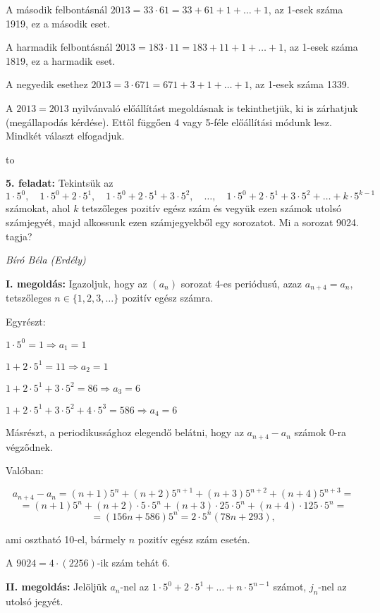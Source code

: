 \documentclass[a4paper,10pt]{article}
\newcommand{\ki}[2]{\hfill {\it #1 (#2)}\medskip}
\newcommand{\vonal}{\hbox to \hsize{\hskip2truecm\hrulefill\hskip2truecm}}
\begin{document}
A második felbontásnál 
$2013 = 33 \cdot  61 = 33 + 61 + 1 + \ldots + 1$, az 1-esek száma 1919, ez a
második eset.

A harmadik felbontásnál 
$2013 = 183 \cdot  11 = 183 + 11 + 1 + \ldots + 1$, az 1-esek száma 1819, ez a harmadik eset.

A negyedik esethez 
$2013 = 3 \cdot  671 = 671 + 3 + 1 + \ldots + 1$, az 1-esek száma 1339. 

A $2013 = 2013$ nyilvánvaló előállítást megoldásnak is tekinthetjük, ki is zárhatjuk (megállapodás kérdése). Ettől függően 4 vagy 5-féle előállítási módunk lesz. Mindkét választ elfogadjuk.


\medskip

\vonal


{\bf 5. feladat: } Tekintsük az 
$$1\cdot 5^0,\quad 1\cdot 5^0+2\cdot 5^1,\quad 1\cdot 5^0+2\cdot 5^1+3\cdot 5^2,\quad\ldots,\quad 1\cdot 5^0+2\cdot 5^1+3\cdot 5^2+\ldots+k\cdot 5^{k-1}$$
számokat, ahol $k$ tetszőleges pozitív egész szám és vegyük ezen számok utolsó számjegyét, 
majd alkossunk ezen számjegyekből egy sorozatot. Mi a sorozat 9024. tagja? 


\ki{Bíró Béla}{Erdély}\medskip

{\bf I. megoldás: } Igazoljuk, hogy az 
$(a_n)$ sorozat 4-es periódusú, azaz $a_{n+4} = {a_n}$, tetszőleges
$n\in \{1, 2, 3,\ldots\}$ pozitív egész számra.

Egyrészt:

$1\cdot 5^0 = 1 \Rightarrow a_1 = 1$

$1+2\cdot 5^1 = 11 \Rightarrow a_2 =1$

$1+2\cdot 5^1 +3\cdot 5^2 = 86 \Rightarrow a_3 =6$

$1+2\cdot 5^1 +3\cdot 5^2 +4\cdot 5^3 = 586 \Rightarrow a_4 =6$

Másrészt, a periodikussághoz elegendő belátni, hogy az 
$a_{n+4} - a_n$ számok 0-ra végződnek.

Valóban:

$$a_{n+4} - a_n = (n+1)5^n + (n+2)5^{n+1} + (n+3)5^{n+2} + (n+4)5^{n+3} = $$
$$= (n+1)5^n + (n+2)\cdot 5\cdot 5^n +
(n+3)\cdot 25\cdot 5^n + (n+4)\cdot 125\cdot 5^n =$$
$$= (156n + 586)5^n =
2\cdot 5^n (78n+293),$$ 

ami osztható 10-el, bármely $n$ pozitív egész szám esetén.

A $9024 = 4 \cdot (2256)$-ik szám tehát 6.


\medskip

{\bf II. megoldás: } Jelöljük $a_n$-nel az 
$1 \cdot 5^0 + 2 \cdot 5^1 + \ldots + n \cdot 5^{n-1}$ számot, 
$j_n$-nel az utolsó jegyét.
\end{document}
